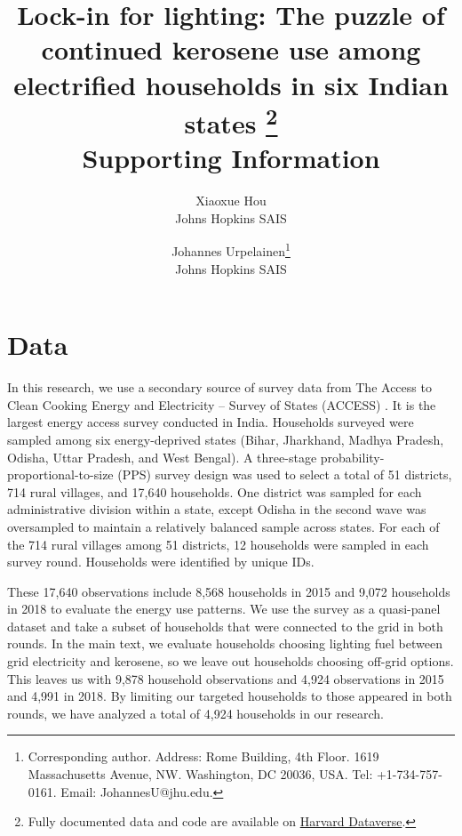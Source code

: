 \documentclass[11pt]{article}
\begin{document}
\title{Lock-in for lighting: The puzzle of continued kerosene use among electrified households in six Indian states \footnote{Fully documented data and code are available on \href{https://doi.org/10.7910/DVN/PVWSOY}{Harvard Dataverse}.}\\\textbf{Supporting Information}}

\author{Xiaoxue Hou\\Johns Hopkins SAIS \and Johannes Urpelainen\footnote{Corresponding author. Address: Rome Building, 4th Floor. 1619 Massachusetts Avenue, NW. Washington, DC 20036, USA. Tel: +1-734-757-0161. Email: JohannesU@jhu.edu.}\\Johns Hopkins SAIS}

\maketitle

\tableofcontents

\clearpage

\doublespacing

\section{Data}

In this research, we use a secondary source of survey data from The Access to Clean Cooking Energy and Electricity -- Survey of States (ACCESS) \citep{Aklinetal2016, Jainetal2018}. It is the largest energy access survey conducted in India. Households surveyed were sampled among six energy-deprived states (Bihar, Jharkhand, Madhya Pradesh, Odisha, Uttar Pradesh, and West Bengal). A three-stage probability-proportional-to-size (PPS) survey design was used to select a total of 51 districts, 714 rural villages, and 17,640 households. One district was sampled for each administrative division within a state, except Odisha in the second wave was oversampled to maintain a relatively balanced sample across states. For each of the 714 rural villages among 51 districts, 12 households were sampled in each survey round. Households were identified by unique IDs.

These 17,640 observations include 8,568 households in 2015 and 9,072 households in 2018 to evaluate the energy use patterns. We use the survey as a quasi-panel dataset and take a subset of households that were connected to the grid in both rounds. In the main text, we evaluate households choosing lighting fuel between grid electricity and kerosene, so we leave out households choosing off-grid options. This leaves us with 9,878 household observations and 4,924 observations in 2015 and 4,991 in 2018. By limiting our targeted households to those appeared in both rounds, we have analyzed a total of 4,924 households in our research.
\end{document}
